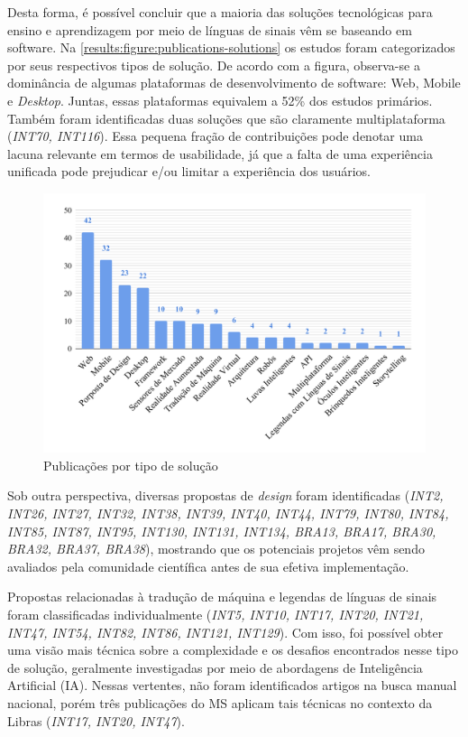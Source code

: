 Desta forma, é possível concluir que a maioria das soluções tecnológicas para ensino e aprendizagem por meio de línguas de sinais vêm se baseando em software. Na \autoref{results:figure:publications-solutions} os estudos foram categorizados por seus respectivos tipos de solução. De acordo com a figura, observa-se a dominância de algumas plataformas de desenvolvimento de software: Web, Mobile e \textit{Desktop}. Juntas, essas plataformas equivalem a 52\% dos estudos primários. Também foram identificadas duas soluções que são claramente multiplataforma (\textit{INT70, INT116}). Essa pequena fração de contribuições pode denotar uma lacuna relevante em termos de usabilidade, já que a falta de uma experiência unificada pode prejudicar e/ou limitar a experiência dos usuários.

\begin{figure}[htbp]
\caption{Publicações por tipo de solução}
\label{results:figure:publications-solutions}
\centerline{\includegraphics[width=\columnwidth]{images/publications-solutions.pdf}}
\fautor
\end{figure}

Sob outra perspectiva, diversas propostas de \textit{design} foram identificadas (\textit{INT2, INT26, INT27, INT32, INT38, INT39, INT40, INT44, INT79, INT80, INT84, INT85, INT87, INT95, INT130, INT131, INT134, BRA13, BRA17, BRA30, BRA32, BRA37, BRA38}), mostrando que os potenciais projetos vêm sendo avaliados pela comunidade científica antes de sua efetiva implementação.

Propostas relacionadas à tradução de máquina e legendas de línguas de sinais foram classificadas individualmente (\textit{INT5, INT10, INT17, INT20, INT21, INT47, INT54, INT82, INT86, INT121, INT129}). Com isso, foi possível obter uma visão mais técnica sobre a complexidade e os desafios encontrados nesse tipo de solução, geralmente investigadas por meio de abordagens de Inteligência Artificial (IA). Nessas vertentes, não foram identificados artigos na busca manual nacional, porém três publicações do MS aplicam tais técnicas no contexto da Libras (\textit{INT17, INT20, INT47}). 


